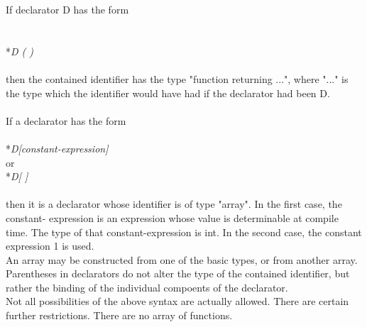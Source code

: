 If declarator D has the form\\\\
		\\*\indent\indent\textit{D ( )}\\\\
then the contained identifier has the type "function returning ...", where "..." is the type which the identifier would have had if the declarator had been D.\\\\
If a declarator has the form\\
		\\*\indent\indent\textit{D[constant-expression]}\\
or
		\\*\indent\indent\textit{D[ ]}\\\\
then it is a declarator whose identifier is of type "array". In the first case, the constant- expression is an expression whose value is determinable at compile time.  The type of that constant-expression is int. In the second case, the constant expression 1 is used. \\

An array may be constructed from one of the basic types, or from another array.\\

Parentheses in declarators do not alter the type of the contained identifier, but rather the binding of the individual compoents of the declarator.\\

Not all possibilities of the above syntax are actually allowed. There are certain further restrictions. There are no array of functions.
